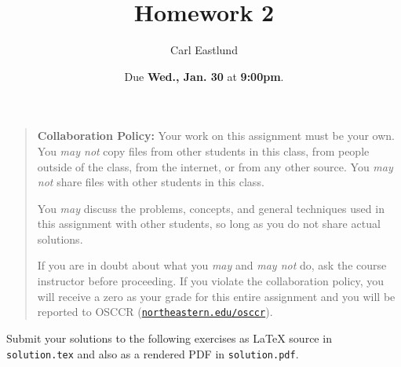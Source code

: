 \documentclass{article}
\title{Homework 2}
\author{Carl Eastlund}
\date{Due \textbf{Wed., Jan. 30} at \textbf{9:00pm}.}
\begin{document}
\maketitle

\newcommand\link[2][http://]{\href{#1#2}{\nolinkurl{#2}}}
\newcommand\http[1]{\link[http://]{#1}}
\newcommand\https[1]{\link[https://]{#1}}
\newcommand\email[1]{\link[mailto:]{#1}}

\begin{quotation}

  \noindent \textbf{Collaboration Policy:} Your work on this assignment must be
  your own.  You \emph{may not} copy files from other students in this class,
  from people outside of the class, from the internet, or from any other source.
  You \emph{may not} share files with other students in this class.

  \medskip

  \noindent You \emph{may} discuss the problems, concepts, and general
  techniques used in this assignment with other students, so long as you do not
  share actual solutions.

  \medskip

  \noindent If you are in doubt about what you \emph{may} and \emph{may not} do,
  ask the course instructor before proceeding.  If you violate the collaboration
  policy, you will receive a zero as your grade for this entire assignment and
  you will be reported to OSCCR (\link{northeastern.edu/osccr}).

\end{quotation}

Submit your solutions to the following exercises as LaTeX source in
\texttt{solution.tex} and also as a rendered PDF in \texttt{solution.pdf}.
\end{document}
